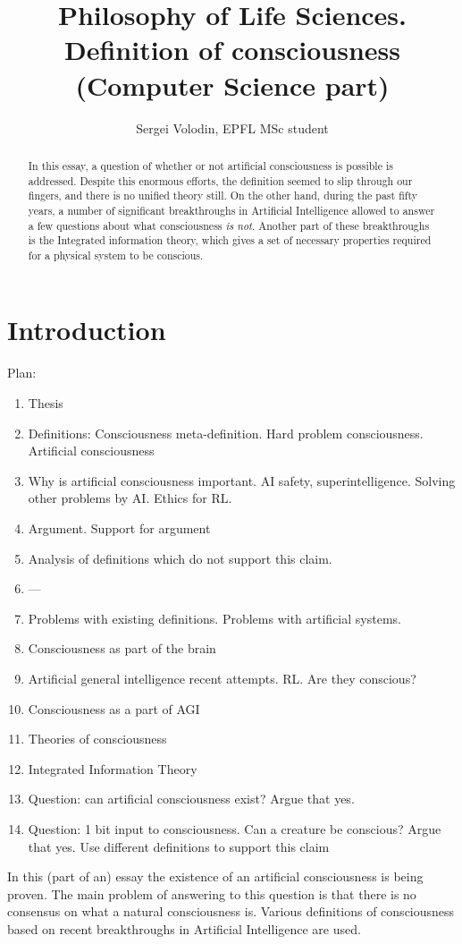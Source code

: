 \documentclass[a4paper, 12pt]{article}
\title{Philosophy of Life Sciences.\\ Definition of consciousness (Computer Science part)}
\author{Sergei Volodin, EPFL MSc student}
\date{}
\begin{document}
\maketitle

\begin{abstract}
In this essay, a question of whether or not artificial consciousness is possible is addressed.
Despite this enormous efforts, the definition seemed to slip through our fingers, and there is no unified theory still.
On the other hand, during the past fifty years, a number of significant breakthroughs in Artificial Intelligence allowed to answer a few questions about what consciousness {\em is not}.
Another part of these breakthroughs is the Integrated information theory, which gives a set of necessary properties required for a physical system to be conscious.
\end{abstract}

\tableofcontents

\section{Introduction}
Plan:\begin{enumerate}
\item Thesis
\item Definitions: Consciousness meta-definition. Hard problem consciousness. Artificial consciousness
\item Why is artificial consciousness important. AI safety, superintelligence. Solving other problems by AI. Ethics for RL.
\item Argument. Support for argument
\item Analysis of definitions which do not support this claim.
\item ---
\item Problems with existing definitions. Problems with artificial systems.
\item Consciousness as part of the brain
\item Artificial general intelligence recent attempts. RL. Are they conscious?
\item Consciousness as a part of AGI
\item Theories of consciousness
\item Integrated Information Theory
\item Question: can artificial consciousness exist? Argue that yes.
\item Question: 1 bit input to consciousness. Can a creature be conscious? Argue that yes. Use different definitions to support this claim
\end{enumerate}
In this (part of an) essay the existence of an artificial consciousness is being proven. The main problem of answering to this question is that there is no consensus on what a natural consciousness is. Various definitions of consciousness based on recent breakthroughs in Artificial Intelligence are used.
\end{document}

